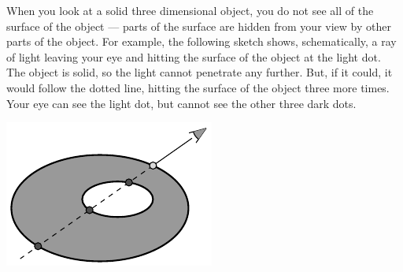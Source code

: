 \begin{eg}
                                             \label{eg:hidden_surface}
When you look at a solid three dimensional object, you do not see all of 
the surface of the object --- parts of the surface are hidden from your view by other parts of the object. For example, the following sketch shows, schematically, a ray of light leaving your eye and hitting the surface of the object at the light dot. The object is solid, so the light cannot penetrate any further. But, if it could, it would follow the dotted line, hitting the surface of the object three more times. Your eye can see the light dot,  but cannot see the other three dark dots. 

\begin{efig}
\begin{center}
   \includegraphics{hiddenA.pdf}
\end{center}
\end{efig}


\end{eg}
